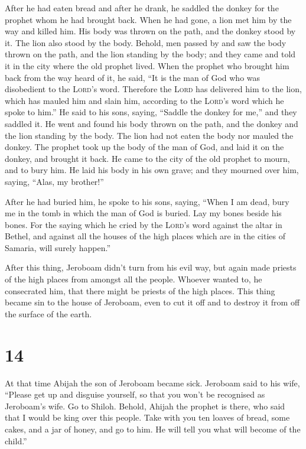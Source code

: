  After he had eaten bread and after he drank, he saddled
the donkey for the prophet whom he had brought back. 
When he had gone, a lion met him by the way and killed him. His body was
thrown on the path, and the donkey stood by it. The lion also stood by
the body.  Behold, men passed by and saw the body thrown
on the path, and the lion standing by the body; and they came and told
it in the city where the old prophet lived.  When the
prophet who brought him back from the way heard of it, he said, ``It is
the man of God who was disobedient to the \textsc{Lord}'s word.
Therefore the \textsc{Lord} has delivered him to the lion, which has
mauled him and slain him, according to the \textsc{Lord}'s word which he
spoke to him.''  He said to his sons, saying, ``Saddle
the donkey for me,'' and they saddled it.  He went and
found his body thrown on the path, and the donkey and the lion standing
by the body. The lion had not eaten the body nor mauled the donkey.
 The prophet took up the body of the man of God, and laid
it on the donkey, and brought it back. He came to the city of the old
prophet to mourn, and to bury him.  He laid his body in
his own grave; and they mourned over him, saying, ``Alas, my brother!''

 After he had buried him, he spoke to his sons, saying,
``When I am dead, bury me in the tomb in which the man of God is buried.
Lay my bones beside his bones.  For the saying which he
cried by the \textsc{Lord}'s word against the altar in Bethel, and
against all the houses of the high places which are in the cities of
Samaria, will surely happen.''

 After this thing, Jeroboam didn't turn from his evil
way, but again made priests of the high places from amongst all the
people. Whoever wanted to, he consecrated him, that there might be
priests of the high places.  This thing became sin to the
house of Jeroboam, even to cut it off and to destroy it from off the
surface of the earth.

\hypertarget{section-13}{%
\section{14}\label{section-13}}

 At that time Abijah the son of Jeroboam became sick.
 Jeroboam said to his wife, ``Please get up and disguise
yourself, so that you won't be recognised as Jeroboam's wife. Go to
Shiloh. Behold, Ahijah the prophet is there, who said that I would be
king over this people.  Take with you ten loaves of bread,
some cakes, and a jar of honey, and go to him. He will tell you what
will become of the child.''

